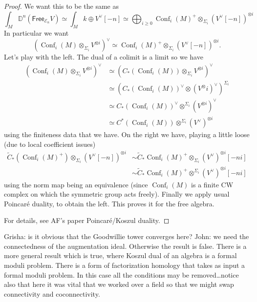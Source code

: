 \documentclass{amsart}
\DeclareMathOperator{\Conf}{Conf}
\begin{document}
\begin{proof}
    We want this to be the same as
    \begin{equation*}
        \int_{M}\mathbb{D}^n(\mathsf{Free}_{\mathcal{E}_n}V) \simeq \int_M k\oplus V^\vee[-n] \simeq \bigoplus_{i\geq 0}\Conf_i(M)^+\otimes_{\Sigma_i}(V^\vee[-n])^{\otimes i}
    \end{equation*}
    In particular we want
    \begin{equation*}
        \left( \Conf_i(M)\otimes_{\Sigma_i} V^{\otimes i} \right)^\vee \simeq \Conf_i(M)^+\otimes_{\Sigma_i}(V^\vee[-n])^{\otimes i}.
    \end{equation*}
    Let's play with the left. The dual of a colimit is a limit so we have
    \begin{align*}
        \left( \Conf_i(M)\otimes_{\Sigma_i} V^{\otimes i} \right)^\vee & \simeq  \left( C_*(\Conf_i(M))\otimes_{\Sigma_i}V^{\otimes i} \right)^\vee \\
        & \simeq \left( C_*(\Conf_i(M))^\vee \otimes (V^\otimes i)^\vee \right)^{\Sigma_i} \\
        & \simeq C_*(\Conf_i(M))^\vee \otimes^{\Sigma_i}(V^{\otimes i})^\vee \\
        & \simeq C^*(\Conf_i(M))\otimes^{\Sigma_i}(V^\vee)^{\otimes i}
    \end{align*}
    using the finiteness data that we have.
    On the right we have, playing a little loose (due to local coefficient issues)
    \begin{align*}
        \tilde C_*(\Conf_i(M)^+)\otimes_{\Sigma_i}\left( V^\vee[-n] \right)^{\otimes i} &\sim \tilde C_*\Conf_i(M)^+\otimes_{\Sigma_i}\left( V^\vee \right)^{\otimes i}[-ni] \\
        &\sim \tilde C_*\Conf_i(M)^+\otimes^{\Sigma_i}\left( V^\vee \right)^{\otimes i}[-ni]
    \end{align*}
    using the norm map being an equivalence (since $\Conf_i(M)$ is a finite CW complex on which the symmetric
    group acts freely). Finally we apply usual Poincar\'e duality, to obtain the left. This proves it for
    the free algebra.

    For details, see AF's paper Poincar\'e/Koszul duality.
\end{proof}
Grisha: is it obvious that the Goodwillie tower converges here?
John: we need the connectedness of the augmentation ideal. Otherwise the result is false. There is
a more general result which is true, where Koszul dual of an algebra is a formal moduli problem.
There is a form of factorization homology that takes as input a formal moduli problem. In this case
all the conditions may be removed\ldots notice also that here it was vital that we worked
over a field so that we might swap connectivity and coconnectivity.
\end{document}
